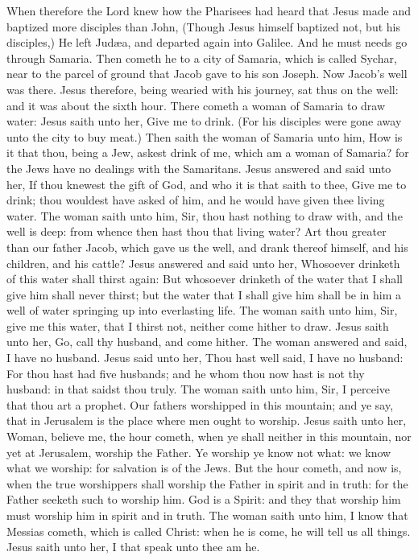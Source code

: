  When therefore the Lord knew how the Pharisees had heard
that Jesus made and baptized more disciples than John, 
(Though Jesus himself baptized not, but his disciples,)  He
left Judæa, and departed again into Galilee.  And he must
needs go through Samaria.  Then cometh he to a city of
Samaria, which is called Sychar, near to the parcel of ground that Jacob
gave to his son Joseph.  Now Jacob's well was there. Jesus
therefore, being wearied with his journey, sat thus on the well: and it
was about the sixth hour.  There cometh a woman of Samaria
to draw water: Jesus saith unto her, Give me to drink.  (For
his disciples were gone away unto the city to buy meat.) 
Then saith the woman of Samaria unto him, How is it that thou, being a
Jew, askest drink of me, which am a woman of Samaria? for the Jews have
no dealings with the Samaritans.  Jesus answered and said
unto her, If thou knewest the gift of God, and who it is that saith to
thee, Give me to drink; thou wouldest have asked of him, and he would
have given thee living water.  The woman saith unto him,
Sir, thou hast nothing to draw with, and the well is deep: from whence
then hast thou that living water?  Art thou greater than
our father Jacob, which gave us the well, and drank thereof himself, and
his children, and his cattle?  Jesus answered and said unto
her, Whosoever drinketh of this water shall thirst again: 
But whosoever drinketh of the water that I shall give him shall never
thirst; but the water that I shall give him shall be in him a well of
water springing up into everlasting life.  The woman saith
unto him, Sir, give me this water, that I thirst not, neither come
hither to draw.  Jesus saith unto her, Go, call thy
husband, and come hither.  The woman answered and said, I
have no husband. Jesus said unto her, Thou hast well said, I have no
husband:  For thou hast had five husbands; and he whom thou
now hast is not thy husband: in that saidst thou truly. 
The woman saith unto him, Sir, I perceive that thou art a prophet.
 Our fathers worshipped in this mountain; and ye say, that
in Jerusalem is the place where men ought to worship. 
Jesus saith unto her, Woman, believe me, the hour cometh, when ye shall
neither in this mountain, nor yet at Jerusalem, worship the Father.
 Ye worship ye know not what: we know what we worship: for
salvation is of the Jews.  But the hour cometh, and now is,
when the true worshippers shall worship the Father in spirit and in
truth: for the Father seeketh such to worship him.  God is
a Spirit: and they that worship him must worship him in spirit and in
truth.  The woman saith unto him, I know that Messias
cometh, which is called Christ: when he is come, he will tell us all
things.  Jesus saith unto her, I that speak unto thee am
he.

